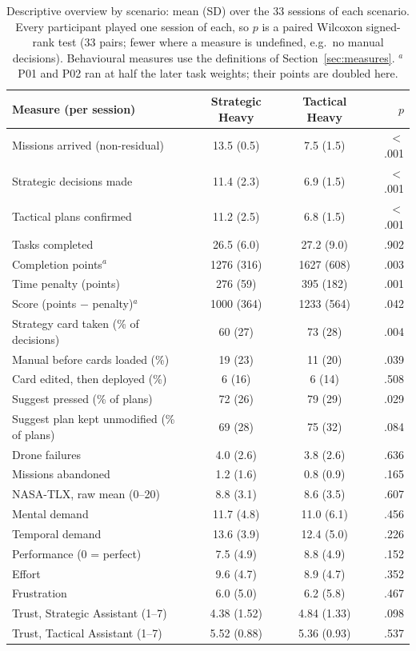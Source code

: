 \begin{table}[htbp]
\centering
\small
\caption{Descriptive overview by scenario: mean (SD) over the 33 sessions of each scenario. Every participant played one session of each, so $p$ is a paired Wilcoxon signed-rank test (33 pairs; fewer where a measure is undefined, e.g.\ no manual decisions). Behavioural measures use the definitions of Section~\ref{sec:measures}. $^a$P01 and P02 ran at half the later task weights; their points are doubled here.}
\label{tab:descriptives}
\begin{tabular}{lccr}
\toprule
\textbf{Measure (per session)} & \textbf{Strategic Heavy} & \textbf{Tactical Heavy} & $p$ \\
\midrule
Missions arrived (non-residual) & 13.5 (0.5) & 7.5 (1.5) & $<$.001 \\
Strategic decisions made & 11.4 (2.3) & 6.9 (1.5) & $<$.001 \\
Tactical plans confirmed & 11.2 (2.5) & 6.8 (1.5) & $<$.001 \\
Tasks completed & 26.5 (6.0) & 27.2 (9.0) & .902 \\
Completion points$^a$ & 1276 (316) & 1627 (608) & .003 \\
Time penalty (points) & 276 (59) & 395 (182) & .001 \\
Score (points $-$ penalty)$^a$ & 1000 (364) & 1233 (564) & .042 \\
Strategy card taken (\% of decisions) & 60 (27) & 73 (28) & .004 \\
Manual before cards loaded (\%) & 19 (23) & 11 (20) & .039 \\
Card edited, then deployed (\%) & 6 (16) & 6 (14) & .508 \\
Suggest pressed (\% of plans) & 72 (26) & 79 (29) & .029 \\
Suggest plan kept unmodified (\% of plans) & 69 (28) & 75 (32) & .084 \\
Drone failures & 4.0 (2.6) & 3.8 (2.6) & .636 \\
Missions abandoned & 1.2 (1.6) & 0.8 (0.9) & .165 \\
NASA-TLX, raw mean (0--20) & 8.8 (3.1) & 8.6 (3.5) & .607 \\
\quad Mental demand & 11.7 (4.8) & 11.0 (6.1) & .456 \\
\quad Temporal demand & 13.6 (3.9) & 12.4 (5.0) & .226 \\
\quad Performance (0 = perfect) & 7.5 (4.9) & 8.8 (4.9) & .152 \\
\quad Effort & 9.6 (4.7) & 8.9 (4.7) & .352 \\
\quad Frustration & 6.0 (5.0) & 6.2 (5.8) & .467 \\
Trust, Strategic Assistant (1--7) & 4.38 (1.52) & 4.84 (1.33) & .098 \\
Trust, Tactical Assistant (1--7) & 5.52 (0.88) & 5.36 (0.93) & .537 \\
\bottomrule
\end{tabular}
\end{table}
